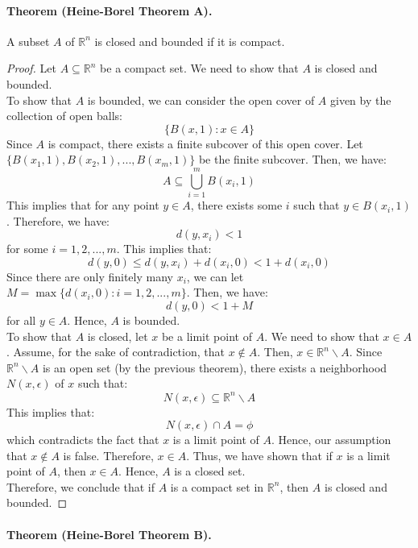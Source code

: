 \documentclass[openany]{book}
\numberwithin{equation}{section}
\begin{document}
\paragraph{Theorem (Heine-Borel Theorem A).}

    A subset $A$ of $\mathbb{R}^n$ is closed and bounded if it is compact.
\par
\begin{proof}
    Let $A \subseteq \mathbb{R}^n$ be a compact set. We need to show that $A$ is closed and bounded. \\
    To show that $A$ is bounded, we can consider the open cover of $A$ given by the collection of open balls:
    $$\{B(x, 1) : x \in A\}$$
    Since $A$ is compact, there exists a finite subcover of this open cover. Let $\{B(x_1, 1), B(x_2, 1), ..., B(x_m, 1)\}$ be the finite subcover. Then, we have:
    $$A \subseteq \bigcup_{i=1}^{m} B(x_i, 1)$$
    This implies that for any point $y \in A$, there exists some $i$ such that $y \in B(x_i, 1)$. Therefore, we have:
    $$d(y, x_i) < 1$$
    for some $i = 1, 2, ..., m$. This implies that:
    $$d(y, 0) \leq d(y, x_i) + d(x_i, 0) < 1 + d(x_i, 0)$$
    Since there are only finitely many $x_i$, we can let $M = \max\{d(x_i, 0) : i = 1, 2, ..., m\}$. Then, we have:
    $$d(y, 0) < 1 + M$$
    for all $y \in A$. Hence, $A$ is bounded. \\
    To show that $A$ is closed, let $x$ be a limit point of $A$. We need to show that $x \in A$. Assume, for the sake of contradiction, that $x \notin A$. Then, $x \in \mathbb{R}^n \backslash A$. Since $\mathbb{R}^n \backslash A$ is an open set (by the previous theorem), there exists a neighborhood $N(x, \epsilon)$ of $x$ such that:
    $$N(x, \epsilon) \subseteq \mathbb{R}^n \backslash A$$
    This implies that:
    $$N(x, \epsilon) \cap A = \phi$$
    which contradicts the fact that $x$ is a limit point of $A$. Hence, our assumption that $x \notin A$ is false. Therefore, $x \in A$. Thus, we have shown that if $x$ is a limit point of $A$, then $x \in A$. Hence, $A$ is a closed set. \\
    Therefore, we conclude that if $A$ is a compact set in $\mathbb{R}^n$, then $A$ is closed and bounded.
\end{proof}
\paragraph{Theorem (Heine-Borel Theorem B).}
\end{document}
